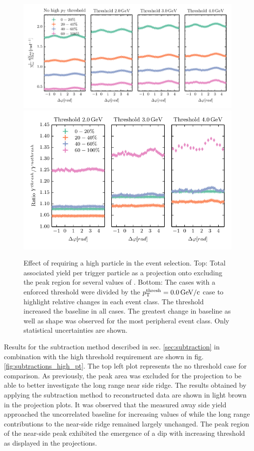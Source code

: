 \begin{figure}
  \centering
  \includegraphics[]{figures/y_px_evolution_with_threshold.pdf}
  \includegraphics[]{figures/y_px_evolution_with_threshold_div_by_thresh0.pdf}
  \caption[Effect of requiring a high \pt particle in the event selection as projections onto \dphi]{Effect of requiring a high \pt particle in the event selection. Top: Total associated yield per trigger particle as a projection onto \dphi excluding the peak region for several values of \ptthresh . Bottom: The cases with a enforced threshold were divided by the $p_{\text{T}}^{\text{thresh}} = \SI{0.0}{GeV/c}$ case to highlight relative changes in each event class. The threshold increased the baseline in all cases. The greatest change in baseline as well as shape was observed for the most peripheral event class. Only statistical uncertainties are shown.}
  \label{fig:y_px_thresh}
\end{figure}

Results for the subtraction method described in sec. \ref{sec:subtraction} in combination with the high \pt threshold requirement are shown in fig. \ref{fig:subtractions_high_pt}. The top left plot represents the no threshold case for comparison. As previously, the peak area was excluded for the \dphi projection to be able to better investigate the long range near side ridge. The results obtained by applying the subtraction method to reconstructed data are shown in light brown in the \dphi projection plots. It was observed that the measured away side yield approached the uncorrelated baseline for increasing values of \ptthresh while the long range contributions to the \gls{near-side} ridge remained largely unchanged. The peak region of the \gls{near-side} peak exhibited the emergence of a dip with increasing threshold as displayed in the \deta projections. 

